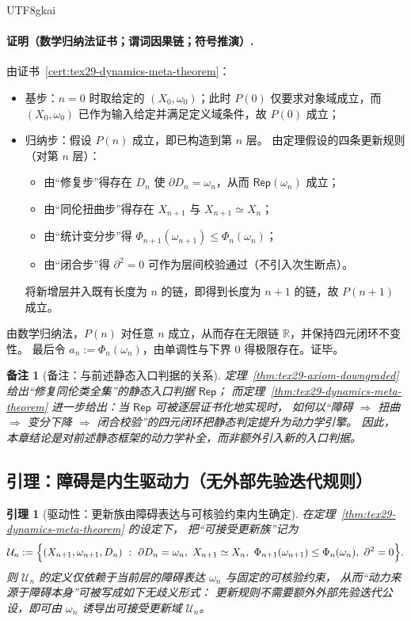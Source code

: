 \documentclass[12pt]{article}
\newtheorem{lemma}{引理}[section]
\newtheorem{remark}{备注}[section]
\begin{document}
\begin{CJK*}{UTF8}{gkai}
\paragraph{证明（数学归纳法证书；谓词因果链；符号推演）.}
由证书~\ref{cert:tex29-dynamics-meta-theorem}：
\begin{itemize}
  \item 基步：$n=0$ 时取给定的 $(X_0,\omega_0)$；此时 $P(0)$ 仅要求对象域成立，而 $(X_0,\omega_0)$ 已作为输入给定并满足定义域条件，故 $P(0)$ 成立；
  \item 归纳步：假设 $P(n)$ 成立，即已构造到第 $n$ 层。
  由定理假设的四条更新规则（对第 $n$ 层）：
  \begin{itemize}
    \item 由“修复步”得存在 $D_n$ 使 $\partial D_n=\omega_n$，从而 $\mathsf{Rep}(\omega_n)$ 成立；
    \item 由“同伦扭曲步”得存在 $X_{n+1}$ 与 $X_{n+1}\simeq X_n$；
    \item 由“统计变分步”得 $\Phi_{n+1}(\omega_{n+1})\le \Phi_n(\omega_n)$；
    \item 由“闭合步”得 $\partial^2=0$ 可作为层间校验通过（不引入次生断点）。
  \end{itemize}
  将新增层并入既有长度为 $n$ 的链，即得到长度为 $n+1$ 的链，故 $P(n+1)$ 成立。
\end{itemize}
由数学归纳法，$P(n)$ 对任意 $n$ 成立，从而存在无限链 $\mathbb{R}$，并保持四元闭环不变性。
最后令 $a_n:=\Phi_n(\omega_n)$，由单调性与下界 $0$ 得极限存在。证毕。

\begin{remark}[备注：与前述静态入口判据的关系]
定理~\ref{thm:tex29-axiom-downgraded} 给出“修复同伦类全集”的静态入口判据 $\mathsf{Rep}$；
而定理~\ref{thm:tex29-dynamics-meta-theorem} 进一步给出：当 $\mathsf{Rep}$ 可被逐层证书化地实现时，
如何以“障碍 $\Rightarrow$ 扭曲 $\Rightarrow$ 变分下降 $\Rightarrow$ 闭合校验”的四元闭环把静态判定提升为动力学引擎。
因此，本章结论是对前述静态框架的动力学补全，而非额外引入新的入口判据。
\end{remark}

\subsection{引理：障碍是内生驱动力（无外部先验迭代规则）}
\label{subsec:tex29-dynamics-meta-driver}

\begin{lemma}[驱动性：更新族由障碍表达与可核验约束内生确定]
\label{lem:tex29-dynamics-meta-driver}
在定理~\ref{thm:tex29-dynamics-meta-theorem} 的设定下，
把“可接受更新族”记为
\[
  \mathcal{U}_n:=\Bigl\{(X_{n+1},\omega_{n+1},D_n)\ :\
  \partial D_n=\omega_n,\ X_{n+1}\simeq X_n,\ \Phi_{n+1}(\omega_{n+1})\le \Phi_n(\omega_n),\ \partial^2=0\Bigr\}.
\]
则 $\mathcal{U}_n$ 的定义仅依赖于当前层的障碍表达 $\omega_n$ 与固定的可核验约束，
从而“动力来源于障碍本身”可被写成如下无歧义形式：
更新规则不需要额外外部先验迭代公设，即可由 $\omega_n$ 诱导出可接受更新域 $\mathcal{U}_n$。
\end{lemma}


\end{CJK*}
\end{document}

